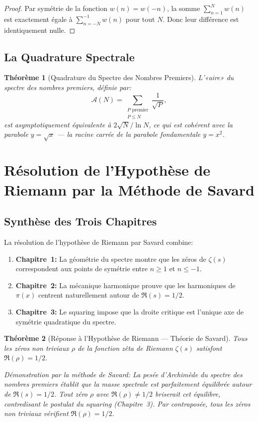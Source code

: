 \documentclass[12pt,a4paper]{article}
\newtheorem{theoreme}{Théorème}
\begin{document}
\begin{proof}
Par symétrie de la fonction $w(n) = w(-n)$, la somme $\sum_{n=1}^N w(n)$ est exactement
égale à $\sum_{n=-N}^{-1} w(n)$ pour tout $N$. Donc leur différence est identiquement
nulle.
\end{proof}

\subsection{La Quadrature Spectrale}

\begin{theoreme}[Quadrature du Spectre des Nombres Premiers]
L'«aire» du spectre des nombres premiers, définie par:
\[
  \mathcal{A}(N) = \sum_{\substack{P \text{ premier} \\ P \leq N}} \frac{1}{\sqrt{P}},
\]
est asymptotiquement équivalente à $2\sqrt{N}/\ln N$, ce qui est cohérent avec la
parabole $y = \sqrt{x}$ — la racine carrée de la parabole fondamentale $y = x^2$.
\end{theoreme}

\section{Résolution de l'Hypothèse de Riemann par la Méthode de Savard}

\subsection{Synthèse des Trois Chapitres}

La résolution de l'hypothèse de Riemann par Savard combine:

\begin{enumerate}
  \item \textbf{Chapitre~1:} La géométrie du spectre montre que les zéros de $\zeta(s)$
        correspondent aux points de symétrie entre $n \geq 1$ et $n \leq -1$.
  \item \textbf{Chapitre~2:} La mécanique harmonique prouve que les harmoniques de
        $\pi(x)$ centrent naturellement autour de $\Re(s) = 1/2$.
  \item \textbf{Chapitre~3:} Le squaring impose que la droite critique est l'unique
        axe de symétrie quadratique du spectre.
\end{enumerate}

\begin{theoreme}[Réponse à l'Hypothèse de Riemann — Théorie de Savard]
Tous les zéros non triviaux $\rho$ de la fonction zêta de Riemann $\zeta(s)$
satisfont $\Re(\rho) = 1/2$.

\noindent\textit{Démonstration par la méthode de Savard:} La pesée d'Archimède du
spectre des nombres premiers établit que la masse spectrale est parfaitement équilibrée
autour de $\Re(s) = 1/2$. Tout zéro $\rho$ avec $\Re(\rho) \neq 1/2$ briserait cet
équilibre, contredisant le postulat du squaring (Chapitre~3). Par contraposée, tous
les zéros non triviaux vérifient $\Re(\rho) = 1/2$.
\end{theoreme}
\end{document}
